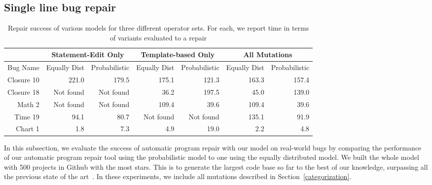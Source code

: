 \documentclass[conference]{IEEEtran}
\begin{document}
\subsection{Single line bug repair}
\label{sec:single}

\begin{table}\centering
\begin{tabular}{r|r|r|r|r|r|r}
\hline
  &\multicolumn{2}{c|}{{Statement-Edit Only}} & \multicolumn{2}{c|}{{Template-based Only}} & \multicolumn{2}{c}{{All Mutations}} \\  
  \hline
 {Bug Name}  & {Equally Dist} & {Probabilistic} & {Equally Dist} & {Probabilistic} &{Equally Dist} & 
{Probabilistic} \\
\hline
 Closure 10 & {221.0} & {179.5}  & {175.1} & {121.3} & {163.3} & {157.4} \\

 Closure 18 &Not found & Not found & {36.2} & {197.5} & {45.0} & {139.0} \\

 Math 2 & {Not found} & {Not found} & {109.4} & {39.6} & {109.4} & {39.6} \\

 Time 19 & {94.1} & {80.7} & {Not found} &{Not found} & {135.1} & {91.9} \\

 Chart 1 & {1.8} & {7.3} & {4.9} & {19.0} & {2.2} & {4.8} \\
\hline

\end{tabular}
\newline
\center
		\caption{Repair success of various models for three different operator
          sets.  For each, we report time in terms of variants evaluated to a
          repair \label{tab:singleLineBugs}}

\end{table}

In this subsection, we evaluate the success of automatic program repair with our
model on real-world bugs  by comparing the performance of our 
automatic program repair tool using the probabilistic model to one using the
equally distributed model.  
We built the whole model with 500
projects in Github with the most stars.
 This is to generate the largest code base so far to the best 
of our knowledge, surpassing all the previous state of the 
art~\cite{long16proph,Soto16,zhong15,martinez15,xuan16}. 
In these experiments, we include all mutations described in
Section~\ref{categorization}.
\end{document}
